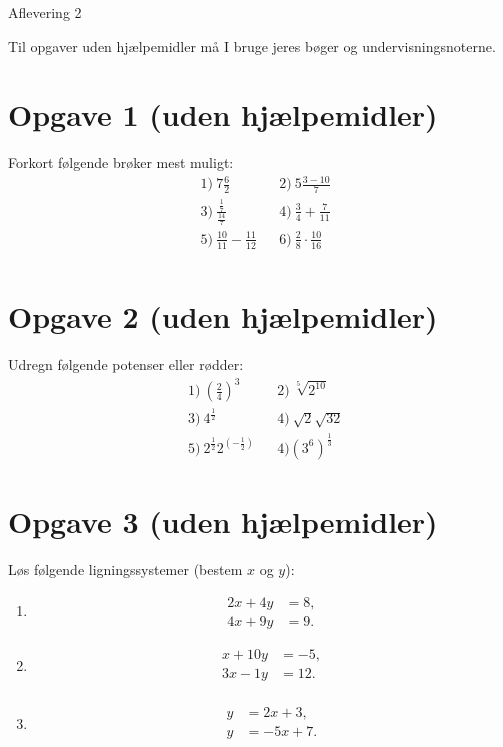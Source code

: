 
\begin{center}
\Huge
Aflevering 2
\end{center}
Til opgaver uden hjælpemidler må I bruge jeres bøger og undervisningsnoterne.
\section*{Opgave 1 \large (uden hjælpemidler)}
Forkort følgende brøker mest muligt:
\begin{align*}
&1) \ 7\frac{6}{2}     &&2) \  5\frac{3-10}{7}   \\
&3) \ \frac{\frac{1}{7}}{\frac{14}{7}}    &&4) \  \frac{3}{4}+\frac{7}{11}  \\
&5) \ \frac{10}{11}-\frac{11}{12}  &&6) \  \frac{2}{8}\cdot \frac{10}{16}     \\
\end{align*}

\section*{Opgave 2 \large (uden hjælpemidler)}
Udregn følgende potenser eller rødder:
\begin{align*}
&1) \  \left(\frac{2}{4}\right)^3   &&2) \ \sqrt[5]{2^{10}}    \\
&3) \  4^{\frac{1}{2}}   &&4) \  \sqrt{2}\sqrt{32}   \\
&5) \ 2^{\frac{1}{2}}2^{(-\frac{1}{2})} &&4) (3^6)^\frac{1}{3}
\end{align*}

\section*{Opgave 3 \large (uden hjælpemidler)}
Løs følgende ligningssystemer (bestem $x$ og $y$):
\begin{enumerate}[label=\roman*)]
\item 
\begin{align*}
2x+4y &= 8,\\
4x+9y &= 9.
\end{align*}
\item \begin{align*}
x+10y &= -5,\\
3x-1y &= 12.\\
\end{align*}
\item
\begin{align*}
y &= 2x+3,\\
y &= -5x+7.\\
\end{align*}
\end{enumerate}

